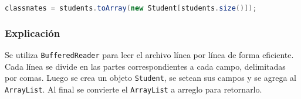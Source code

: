 \begin{lstlisting}[language=Java,caption=Conversión de ArrayList a arreglo]
classmates = students.toArray(new Student[students.size()]);
\end{lstlisting}

\subsubsection{Explicación}

Se utiliza \texttt{BufferedReader} para leer el archivo línea por línea de forma eficiente. Cada línea se divide en las partes correspondientes a cada campo, delimitadas por comas. Luego se crea un objeto \texttt{Student}, se setean sus campos y se agrega al \texttt{ArrayList}. Al final se convierte el \texttt{ArrayList} a arreglo para retornarlo.